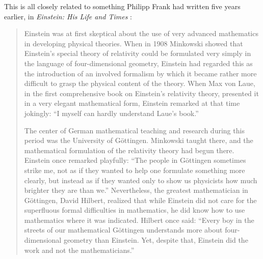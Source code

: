 This is all closely related to something Philipp Frank had written five years earlier, in \textit{Einstein: His Life and Times} \cite{Frank1947}:
\begin{quotation}
Einstein was at first skeptical about the use of very advanced mathematics in developing physical theories. When in 1908 Minkowski showed that Einstein's special theory of relativity could be formulated very simply in the language of four-dimensional geometry, Einstein had regarded this as the introduction of an involved formalism by which it became rather more difficult to grasp the physical content of the theory. When Max von Laue, in the first comprehensive book on Einstein's relativity theory, presented it in a very elegant mathematical form, Einstein remarked at that time jokingly: ``I myself can hardly understand Laue's book.''

The center of German mathematical teaching and research during this period was the University of G\"{o}ttingen. Minkowski taught there, and the mathematical formulation of the relativity theory had begun there. Einstein once remarked playfully: ``The people in G\"{o}ttingen sometimes strike me, not as if they wanted to help one formulate something more clearly, but instead as if they wanted only to show us physicists how much brighter they are than we.'' Nevertheless, the greatest mathematician in G\"{o}ttingen, David Hilbert, realized that while Einstein did not care for the superfluous formal difficulties in mathematics, he did know how to use mathematics where it was indicated. Hilbert once said: ``Every boy in the streets of our mathematical G\"{o}ttingen understands more about four-dimensional geometry than Einstein. Yet, despite that, Einstein did the work and not the mathematicians.''
\end{quotation}

